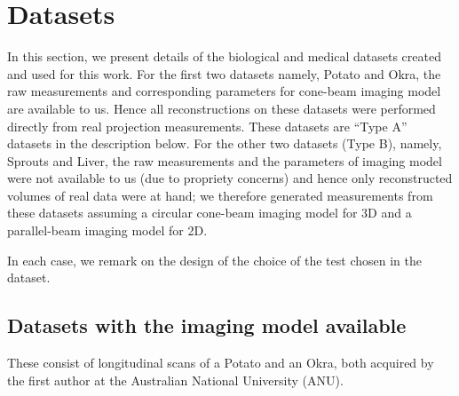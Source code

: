 \documentclass[journal]{IEEEtran}
\begin{document}
\section{Datasets}
\label{sec:datasets}
In this section, we present details of the biological and medical
datasets created and used for this work. For the first two datasets
namely, Potato and Okra, the raw measurements and corresponding
parameters for cone-beam imaging model are available to us.  Hence all
reconstructions on these datasets were performed directly from real
projection measurements. These datasets are ``Type A'' datasets in the
description below.  For the other two datasets (Type B), namely,
Sprouts and Liver, the raw measurements and the parameters of imaging
model were not available to us (due to propriety concerns) and hence
only reconstructed volumes of real data were at hand; we therefore
generated measurements from these datasets assuming a circular
cone-beam imaging model for 3D and a parallel-beam imaging model for
2D.

In each case, we remark on the design of the choice of the test chosen
in the dataset.

\subsection{Datasets with the imaging model available}
\label{sec:potatoAndOkra}

These consist of longitudinal scans of a Potato and an Okra, both
acquired by the first author at the Australian National University
(ANU). 
\end{document}
